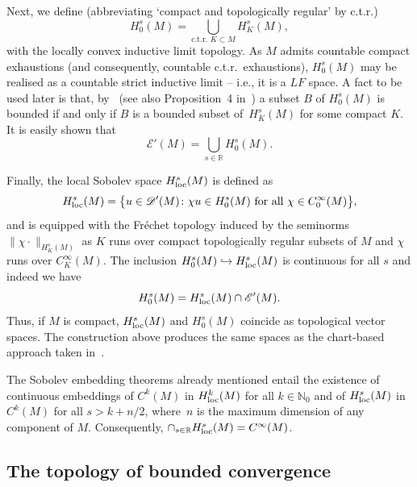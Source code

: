 \documentclass[pdftex]{sigma}
\numberwithin{equation}{section}
\newcommand{\RR}{{\mathbb R}}
\newcommand{\NN}{{\mathbb N}}
\newcommand{\DD}{{\mathscr D}}
\newcommand{\EE}{{\mathscr E}}
\newcommand{\loc}{{\rm loc}}
\begin{document}
 Next, we define (abbreviating `compact and topologically regular' by c.t.r.)
 \begin{equation*}
 	H_0^s(M) = \bigcup_{\text{c.t.r. $K\subset M$}} H^s_K(M),
 \end{equation*}
 with the locally convex inductive limit topology.
 As $M$ admits countable compact exhaustions (and consequently, countable c.t.r.\ exhaustions), $H_0^s(M)$ may be realised as a countable strict inductive limit -- i.e., it is a $LF$ space. A fact to be used later is that, by~\cite[Proposition~14.6]{Treves:TVS} (see also Proposition~4 in~\cite{DieudonneSchwartz:1949}) a subset $B$ of $H_0^s(M)$ is bounded if and only if $B$ is a bounded subset of~$H^s_K(M)$ for some compact $K$. It is easily shown that
 \begin{equation*}
 	\EE'(M) = \bigcup_{s\in\RR} H_0^{s}(M).
 \end{equation*}






 Finally, the local Sobolev space $H^s_\loc(M)$ is defined as
 \begin{equation*}
 	H^s_\loc(M) = \big\{u\in\DD'(M)\colon \text{$\chi u\in H^s_0(M)$ for all $\chi\in C_0^\infty({M})$}\big\},
 \end{equation*}
 and is equipped with the Fr\'echet topology induced by the seminorms $\|\chi \cdot\|_{H^s_{K}(M)}$ as $K$ runs over compact topologically regular subsets of $M$ and $\chi$ runs over $C^\infty_K(M)$. The inclusion
 $H^s_0(M)\hookrightarrow H^s_\loc(M)$ is continuous for all $s$ and indeed we have
 \begin{equation*}
 	H^s_0(M) = H^s_\loc(M) \cap \EE'(M).
 \end{equation*}
 Thus, if $M$ is compact, $H^s_\loc(M)$ and $H^s_0(M)$ coincide as topological vector spaces. The construction above produces the same spaces as the chart-based approach taken in~\cite{Hormander3}.

 The Sobolev embedding theorems already mentioned entail the existence of continuous embeddings of $C^k(M)$ in $H^k_\loc(M)$ for all $k\in\NN_0$ and of $H^s_\loc(M)$ in $C^k(M)$ for all $s>k+n/2$, where~$n$ is the maximum dimension of any component of $M$. Consequently, $\cap_{s\in\RR} H^s_\loc(M)=C^\infty(M)$.

 \subsection{The topology of bounded convergence}\label{appx:top_bded_cvgnce}
\end{document}
